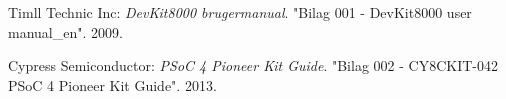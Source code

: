 \renewcommand{\bibname}{Litteraturliste}
\begin{thebibliography}{2}

 Timll Technic Inc: \textit{DevKit8000 brugermanual}. "Bilag 001 - DevKit8000 user manual\_en". 2009.

 Cypress Semiconductor: \textit{PSoC 4 Pioneer Kit Guide}. "Bilag 002 - CY8CKIT-042 PSoC 4 Pioneer Kit Guide". 2013.

\end{thebibliography}